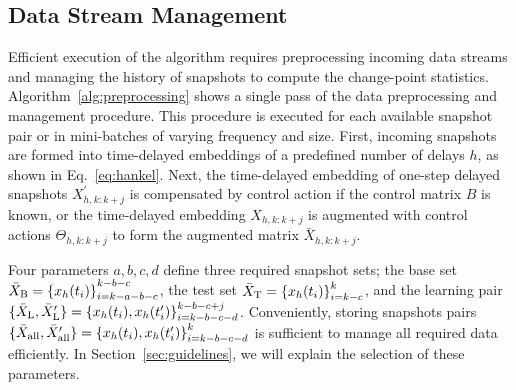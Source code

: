 \subsection{Data Stream Management}
Efficient execution of the algorithm requires preprocessing incoming data streams and managing the history of snapshots to compute the change-point statistics. Algorithm~\ref{alg:preprocessing} shows a single pass of the data preprocessing and management procedure. This procedure is executed for each available snapshot pair or in mini-batches of varying frequency and size. First, incoming snapshots are formed into time-delayed embeddings of a predefined number of delays \( h \), as shown in Eq.~\eqref{eq:hankel}. Next, the time-delayed embedding of one-step delayed snapshots \( X^\prime_{h, k: k + j} \) is compensated by control action if the control matrix \( B \) is known, or the time-delayed embedding \( X_{h, k: k + j} \) is augmented with control actions \( \Theta_{h, k: k + j} \) to form the augmented matrix \( \bar{X}_{h, k: k + j} \).

Four parameters \(a, b, c, d\) define three required snapshot sets; the base set \({\bar{X} _{\text{B}} = \{x_h(t_i)\}}^{k - b - c}_{i=k - a - b - c}\), the test set \(\bar{X} _{\text{T}} = {\{x_h(t_i)\}}^{k}_{i=k - c}\), and the learning pair \( \{\bar{X} _{\text{L}}, \bar{X}^\prime _{\text{L}}\} = {\{x_h(t_i), x_h(t_i^\prime )\}}^{k - b - c + j}_{i=k - b - c - d}\). Conveniently, storing snapshots pairs \( \{\bar{X} _{\text{all}}, \bar{X}^\prime _{\text{all}}\} = {\{x_h(t_i), x_h(t_i^\prime )\}}^{k}_{i=k - b - c - d}\) is sufficient to manage all required data efficiently. In Section~\ref{sec:guidelines}, we will explain the selection of these parameters.

